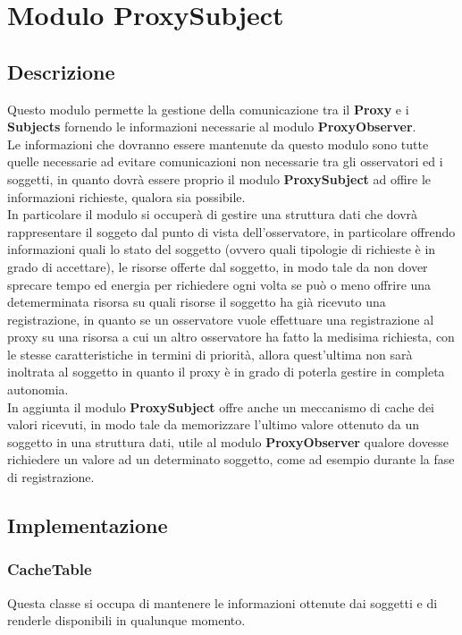 \chapter{Modulo ProxySubject}
\section{Descrizione}
Questo modulo permette la gestione della comunicazione tra il \textbf{Proxy} e i \textbf{Subjects} fornendo le informazioni necessarie al modulo \textbf{ProxyObserver}.\\
Le informazioni che dovranno essere mantenute da questo modulo sono tutte quelle necessarie ad evitare comunicazioni non necessarie tra gli osservatori ed i soggetti, in quanto dovrà essere proprio il modulo \textbf{ProxySubject} ad offire le informazioni richieste, qualora sia possibile. \\
In particolare il modulo si occuperà di gestire una struttura dati che dovrà rappresentare il soggeto dal punto di vista dell'osservatore, in particolare offrendo informazioni quali lo stato del soggetto (ovvero quali tipologie di richieste è in grado di accettare), le risorse offerte dal soggetto, in modo tale da non dover sprecare tempo ed energia per richiedere ogni volta se può o meno offrire una detemerminata risorsa su quali risorse il soggetto ha già ricevuto una registrazione, in quanto se un osservatore vuole effettuare una registrazione al proxy su una risorsa a cui un altro osservatore ha fatto la medisima richiesta, con le stesse caratteristiche in termini di priorità, allora quest'ultima non sarà inoltrata al soggetto in quanto il proxy è in grado di poterla gestire in completa autonomia. \\
In aggiunta il modulo  \textbf{ProxySubject} offre anche un meccanismo di cache dei valori ricevuti, in modo tale da memorizzare l'ultimo valore ottenuto da un soggetto in una struttura dati, utile al modulo \textbf{ProxyObserver} qualore dovesse richiedere un valore ad un determinato soggetto, come ad esempio durante la fase di registrazione.
\section{Implementazione}
\subsection{CacheTable}
Questa classe si occupa di mantenere le informazioni ottenute dai soggetti e di renderle disponibili in qualunque momento.
